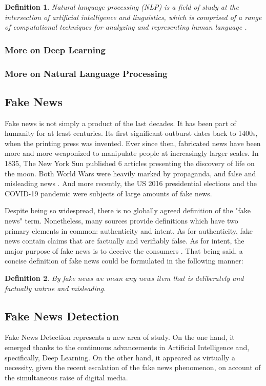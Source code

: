 \documentclass[12pt, a4paper]{article}
\newtheorem{definition}{Definition}
\begin{document}
  \begin{definition}
    Natural language processing (NLP) is a field of study at the intersection of artificial intelligence and linguistics, which is comprised of a range of computational techniques for analyzing and representing human language \cite{a8}.
  \end{definition}

  \subsubsection{More on Deep Learning}
  \subsubsection{More on Natural Language Processing}

  \subsection{Fake News}
  Fake news is not simply a product of the last decades. It has been part of humanity for at least centuries. Its first significant outburst dates back to 1400s, when the printing press was invented. Ever since then, fabricated news have been more and more weaponized to manipulate people at increasingly larger scales. In 1835, The New York Sun published 6 articles presenting the discovery of life on the moon. Both World Wars were heavily marked by propaganda, and false and misleading news \cite{a4}. And more recently, the US 2016 presidential elections and the COVID-19 pandemic were subjects of large amounts of fake news.

  Despite being so widespread, there is no globally agreed definition of the "fake news" term. Nonetheless, many sources provide definitions which have two primary elements in common: authenticity and intent. As for authenticity, fake news contain claims that are factually and verifiably false. As for intent, the major purpose of fake news is to deceive the consumers \cite{a2}. That being said, a concise definition of fake news could be formulated in the following manner:

  \begin{definition}
    By fake news we mean any news item that is deliberately and factually untrue and misleading.
  \end{definition}

  \subsection{Fake News Detection}
  Fake News Detection represents a new area of study. On the one hand, it emerged thanks to the continuous advancements in Artificial Intelligence and, specifically, Deep Learning. On the other hand, it appeared as virtually a necessity, given the recent escalation of the fake news phenomenon, on account of the simultaneous raise of digital media.
\end{document}
